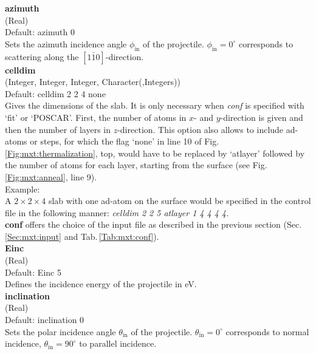 \documentclass[twoside, 11pt, titlepage, captions=nooneline, a4paper, headsepline]{scrbook}%
\newcommand{\9}{\mathrm}
\newcommand{\0}{\,\mathrm}
\begin{document}
\noindent\textbf{azimuth}\\ 
(Real)\\
Default: azimuth 0\\
Sets the azimuth incidence angle $\phi_\mathrm{in}$ of the projectile. $\phi_\mathrm{in}=0^\circ$ corresponds to scattering along the $[1\bar{1}0]$-direction.\\

\noindent\textbf{celldim}\\ 
(Integer, Integer, Integer, Character(,Integers))\\
Default: celldim 2 2 4 none\\
Gives the dimensions of the slab. It is only necessary when \textit{conf} is specified with `fit' or `POSCAR'. First, the number of atoms in $x$- and $y$-direction is given and then the number of layers in $z$-direction. This option also allows to include ad-atoms or steps, for which the flag `none' in line 10 of Fig.\,\ref{Fig:mxt:thermalization}, top, would have to be replaced by `atlayer' followed by the number of atoms for each layer, starting from the surface (see Fig.\,\ref{Fig:mxt:anneal}, line 9).\\
Example:\\
A $2\times2\times4$ slab with one ad-atom on the surface would be specified in the control file in the following manner: \textit{celldim 2 2 5 atlayer 1 4 4 4 4.}\\


\noindent\textbf{conf} offers the choice of the input file as described in the previous section (Sec.\,\ref{Sec:mxt:input} and Tab.\,\ref{Tab:mxt:conf}).\\

\noindent\textbf{Einc}\\ 
(Real)\\ 
Default: Einc 5\\
Defines the incidence energy of the projectile in eV.\\

\noindent\textbf{inclination}\\ 
(Real)\\ 
Default: inclination 0\\
Sets the polar incidence angle $\theta_\mathrm{in}$ of the projectile. $\theta_\mathrm{in}=0^\circ$ corresponds to normal incidence, $\theta_\mathrm{in}=90^\circ$ to parallel incidence.\\
\end{document}
